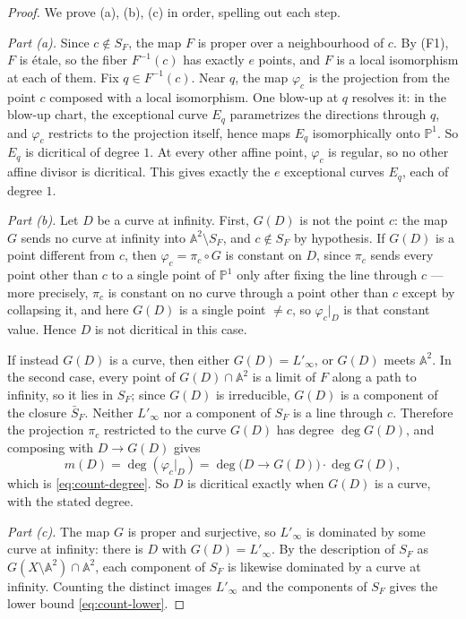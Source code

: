 \documentclass[a4paper,11pt]{article}
\theoremstyle{plain}
\theoremstyle{definition}
\theoremstyle{remark}
\begin{document}
\begin{proof}
We prove (a), (b), (c) in order, spelling out each step.

\emph{Part (a).} Since $c \notin S_F$, the map $F$ is proper over a neighbourhood of $c$.
By (F1), $F$ is \'{e}tale, so the fiber $F^{-1}(c)$ has exactly $e$ points, and $F$ is a local
isomorphism at each of them. Fix $q \in F^{-1}(c)$. Near $q$, the map $\varphi_c$ is the
projection from the point $c$ composed with a local isomorphism. One blow-up at $q$ resolves
it: in the blow-up chart, the exceptional curve $E_q$ parametrizes the directions through $q$,
and $\varphi_c$ restricts to the projection itself, hence maps $E_q$ isomorphically onto
$\mathbb{P}^1$. So $E_q$ is dicritical of degree $1$. At every other affine point,
$\varphi_c$ is regular, so no other affine divisor is dicritical. This gives exactly the $e$
exceptional curves $E_q$, each of degree $1$.

\emph{Part (b).} Let $D$ be a curve at infinity. First, $G(D)$ is not the point $c$: the map $G$
sends no curve at infinity into $\mathbb{A}^2 \setminus S_F$, and $c \notin S_F$ by hypothesis.
If $G(D)$ is a point different from $c$, then $\varphi_c = \pi_c \circ G$ is constant on $D$,
since $\pi_c$ sends every point other than $c$ to a single point of $\mathbb{P}^1$ only after
fixing the line through $c$ --- more precisely, $\pi_c$ is constant on no curve through a point
other than $c$ except by collapsing it, and here $G(D)$ is a single point $\neq c$, so
$\varphi_c|_D$ is that constant value. Hence $D$ is not dicritical in this case.

If instead $G(D)$ is a curve, then either $G(D) = L'_\infty$, or $G(D)$ meets
$\mathbb{A}^2$. In the second case, every point of $G(D) \cap \mathbb{A}^2$ is a limit of $F$
along a path to infinity, so it lies in $S_F$; since $G(D)$ is irreducible, $G(D)$ is a
component of the closure $\bar{S}_F$. Neither $L'_\infty$ nor a component of $S_F$ is a line
through $c$. Therefore the projection $\pi_c$ restricted to the curve $G(D)$ has degree
$\deg G(D)$, and composing with $D \to G(D)$ gives
\[
m(D) = \deg(\varphi_c|_D) = \deg\big(D \to G(D)\big) \cdot \deg G(D),
\]
which is \eqref{eq:count-degree}. So $D$ is dicritical exactly when $G(D)$ is a curve, with
the stated degree.

\emph{Part (c).} The map $G$ is proper and surjective, so $L'_\infty$ is dominated by some
curve at infinity: there is $D$ with $G(D) = L'_\infty$. By the description of $S_F$ as
$G(X \setminus \mathbb{A}^2) \cap \mathbb{A}^2$, each component of $S_F$ is likewise
dominated by a curve at infinity. Counting the distinct images $L'_\infty$ and the components
of $S_F$ gives the lower bound \eqref{eq:count-lower}.
\end{proof}
\end{document}
